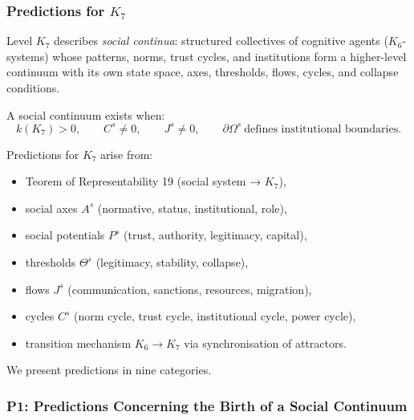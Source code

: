 

\subsubsection{Predictions for \texorpdfstring{$K_7$}{K_7}}
\label{sec:predictions-k7}

Level $K_7$ describes \emph{social continua}: structured collectives of
cognitive agents ($K_6$-systems) whose patterns, norms, trust cycles,
and institutions form a higher-level continuum with its own state space,
axes, thresholds, flows, cycles, and collapse conditions.

A social continuum exists when:
\[
k(K_7) > 0,
\qquad
C^s \neq 0,
\qquad
J^s \neq 0,
\qquad
\partial\Omega^s \ \text{defines institutional boundaries}.
\]

Predictions for $K_7$ arise from:
\begin{itemize}
    \item Teorem of Representability 19 (social system → $K_7$),
    \item social axes $A^s$ (normative, status, institutional, role),
    \item social potentials $P^s$ (trust, authority, legitimacy, capital),
    \item thresholds $\Theta^s$ (legitimacy, stability, collapse),
    \item flows $J^s$ (communication, sanctions, resources, migration),
    \item cycles $C^s$ (norm cycle, trust cycle, institutional cycle, power cycle),
    \item transition mechanism $K_6 \to K_7$ via synchronisation of attractors.
\end{itemize}

We present predictions in nine categories.

\subsubsection{P1: Predictions Concerning the Birth of a Social Continuum}

